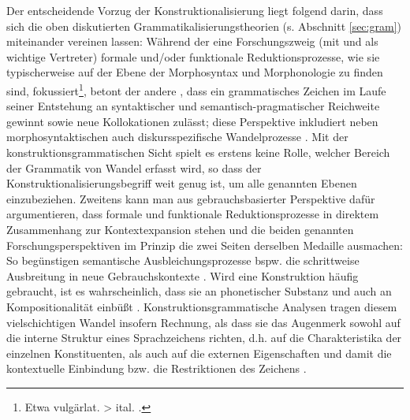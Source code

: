 Der entscheidende Vorzug der Konstruktionalisierung liegt \textcite[60-62]{Traugott2015} folgend darin, dass sich die oben diskutierten Grammatikalisierungstheorien (s. Abschnitt \ref{sec:gram}) miteinander vereinen lassen: Während der eine Forschungszweig (mit \cite{Lehmann1995} und \cite{Haspelmath2004} als wichtige Vertreter) formale und/oder funktionale Reduktionsprozesse, wie sie typischerweise auf der Ebene der Morphosyntax und Morphonologie zu finden sind, fokussiert\footnote{Etwa vulgärlat.   > ital.   \parencite[1254]{Lehmann1995}.}, betont der andere \parencite[vertreten u.a. durch][]{Himmelmann2004,Croft2006}, dass ein grammatisches Zeichen im Laufe seiner Entstehung an syntaktischer und semantisch-pragmatischer Reichweite gewinnt sowie neue Kollokationen zulässt; diese Perspektive inkludiert neben morphosyntaktischen auch diskursspezifische Wandelprozesse \parencite[vgl. den Begriff der  für die Entwicklung von Diskursmarkern bei][]{Auer2005}. Mit der konstruktionsgrammatischen Sicht spielt es erstens keine Rolle, welcher Bereich der Grammatik von Wandel erfasst wird, so dass der Konstruktionalisierungsbegriff weit genug ist, um alle genannten Ebenen einzubeziehen. Zweitens kann man aus gebrauchsbasierter Perspektive dafür argumentieren, dass formale und funktionale Reduktionsprozesse in direktem Zusammenhang zur Kontextexpansion stehen und die beiden genannten Forschungsperspektiven im Prinzip die zwei Seiten derselben Medaille ausmachen: So begünstigen semantische Ausbleichungsprozesse bspw. die schrittweise Ausbreitung in neue Gebrauchskontexte \parencite[61]{Traugott2015}. Wird eine Konstruktion häufig gebraucht, ist es wahrscheinlich, dass sie an phonetischer Substanz und auch an Kompositionalität einbüßt \parencite[20]{Bybee2010}.  Konstruktionsgrammatische Analysen tragen diesem vielschichtigen Wandel insofern Rechnung, als dass sie das Augenmerk sowohl auf die interne Struktur eines Sprachzeichens richten, d.h. auf die Charakteristika der einzelnen Konstituenten, als auch auf die externen Eigenschaften und damit die kontextuelle Einbindung bzw. die Restriktionen des Zeichens  \parencite[zu diesem externen/internen Kontrast s. weiterführend][]{Fried2013}.  

